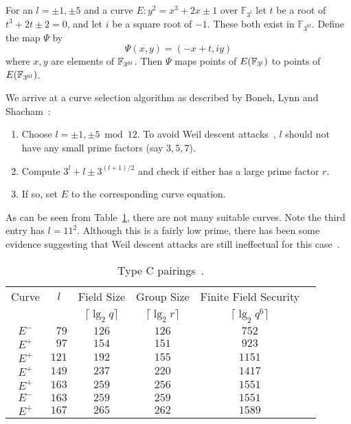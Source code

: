 For an $l = \pm 1, \pm 5$ and a
curve $E : y^2 = x^3 + 2 x \pm 1$ over $\mathbb{F}_{3^l}$
let $t$ be a root of $t^3 + 2t \pm 2 = 0$, and let $i$ be a
square root of $-1$. These both exist in $\mathbb{F}_{3^{6l}}$.
Define the map $\Psi$ by
\[ \Psi(x,y) = (-x + t, i y) \]
where $x, y$ are elements of $\mathbb{F}_{3^{6l}}$. Then $\Psi$ maps points
of $E(\mathbb{F}_{3^l})$ to points of $E(\mathbb{F}_{3^{6l}})$.

We arrive at a curve selection algorithm as described by
Boneh, Lynn and Shacham~\cite{bls}:

\begin{enumerate}
\item
Choose $l = \pm 1, \pm 5 \bmod 12$. To avoid Weil descent attacks~\cite{weildescent1, weildescent2},
$l$ should not have any small prime factors (say $3,5,7$).
\item
Compute $3^l + l \pm 3^{(l+1)/2}$ and check if either has a large prime
factor $r$.
\item
If so, set $E$ to the corresponding curve equation.
\end{enumerate}

As can be seen from Table~\ref{tbl:typec}, there are not many suitable
curves. Note the third entry has $l = 11^2$. Although this is a fairly low
prime, there has been some evidence suggesting that Weil descent attacks
are still ineffectual for this case~\cite{ghsonodd}.

\begin{table}
\begin{center}
\begin{tabular}{|c|c|c|c|c|c|}

  \hline
  Curve & $l$ & Field       Size      & Group Size         & Finite Field Security \\
        &     & $\lceil\lg_2 q \rceil$ & $\lceil \lg_2 r \rceil$ &
    $\lceil \lg_2 {q^6} \rceil$ \\

  \hline
  $E^-$ & $\phantom079$ & $126$ & $126$ & $752$ \\
  \hline
  $E^+$ & $\phantom097$  & $154$ & $151$ & $923$ \\
  \hline
  $E^+$ & $121$ & $192$ & $155$ & $1151$ \\
  \hline
  $E^+$ & $149$ & $237$ & $220$ & $1417$ \\
  \hline
  $E^+$ & $163$ & $259$ & $256$ & $1551$ \\
  \hline
  $E^-$ & $163$ & $259$ & $259$ & $1551$ \\
  \hline
  $E^+$ & $167$ & $265$ & $262$ & $1589$ \\
  \hline
\end{tabular}
\end{center}
\caption{  \label{tbl:typec}
  Type C pairings~\cite{bls}.
}
\end{table}

